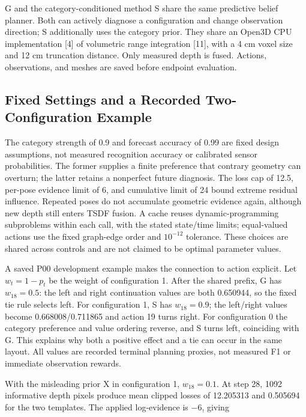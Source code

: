 \documentclass[11pt,a4paper]{article}
\begin{document}
G and the category-conditioned method S share the same predictive belief planner. Both can actively diagnose a configuration and change observation direction; S additionally uses the category prior. They share an Open3D CPU implementation {[}4{]} of volumetric range integration {[}11{]}, with a 4 cm voxel size and 12 cm truncation distance. Only measured depth is fused. Actions, observations, and meshes are saved before endpoint evaluation.

\hypertarget{fixed-settings-and-a-recorded-two-configuration-example}{%
\subsection{Fixed Settings and a Recorded Two-Configuration Example}\label{fixed-settings-and-a-recorded-two-configuration-example}}

The category strength of 0.9 and forecast accuracy of 0.99 are fixed design assumptions, not measured recognition accuracy or calibrated sensor probabilities. The former supplies a finite preference that contrary geometry can overturn; the latter retains a nonperfect future diagnosis. The loss cap of 12.5, per-pose evidence limit of 6, and cumulative limit of 24 bound extreme residual influence. Repeated poses do not accumulate geometric evidence again, although new depth still enters TSDF fusion. A cache reuses dynamic-programming subproblems within each call, with the stated state/time limits; equal-valued actions use the fixed graph-edge order and \(10^{-12}\) tolerance. These choices are shared across controls and are not claimed to be optimal parameter values.

A saved P00 development example makes the connection to action explicit. Let \(w_t=1-p_t\) be the weight of configuration 1. After the shared prefix, G has \(w_{18}=0.5\): the left and right continuation values are both 0.650944, so the fixed tie rule selects left. For configuration 1, S has \(w_{18}=0.9\); the left/right values become 0.668008/0.711865 and action 19 turns right. For configuration 0 the category preference and value ordering reverse, and S turns left, coinciding with G. This explains why both a positive effect and a tie can occur in the same layout. All values are recorded terminal planning proxies, not measured F1 or immediate observation rewards.

With the misleading prior X in configuration 1, \(w_{18}=0.1\). At step 28, 1092 informative depth pixels produce mean clipped losses of 12.205313 and 0.505694 for the two templates. The applied log-evidence is −6, giving
\end{document}

